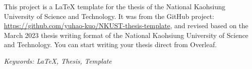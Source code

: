\renewcommand{\abstractname}{Abstract}
\clearpage
{}
\addchaptertocentry{\abstractname}
\begin{engabstract}

    This project is a {\LaTeX} template for the thesis of the National Kaohsiung University of Science and Technology. It was from the GitHub project: \url{https://github.com/yuhao-kuo/NKUST-thesis-template}, and revised based on the March 2023 thesis writing format of the National Kaohsiung University of Science and Technology. You can start writing your thesis direct from Overleaf.

\hbox{}
\it{Keywords: LaTeX, Thesis, Template}
\end{engabstract}